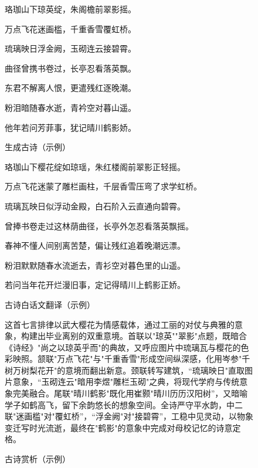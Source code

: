 \begin{figure}[ht]
  \centering
  \begin{tcolorbox}[
      colback=white,
      colframe=black,
      boxrule=1pt,
      arc=0mm,
      width=0.6\linewidth,  %
      ]
      \kaishu
      \centering
      珞珈山下琼英绽，朱阁檐前翠影摇。\par
      万点飞花迷画槛，千重香雪覆虹桥。\par
      琉璃映日浮金阙，玉砌连云接碧霄。\par
      曲径曾携书卷过，长亭忍看落英飘。\par
      东君不解离人恨，更遣残红逐晚潮。\par
      粉泪暗随春水逝，青衿空对暮山遥。\par
      他年若问芳菲事，犹记晴川鹤影娇。\par
  \end{tcolorbox}
  \caption{生成古诗（示例）}
  \label{fig:example_poem}
\end{figure}


\begin{figure}[ht]
  \centering
  \begin{tcolorbox}[
      colback=white,
      colframe=black,
      boxrule=1pt,
      arc=0mm,
      width=0.7\linewidth,  %
      ]
      \kaishu
      \centering
      珞珈山下樱花绽如琼瑶，朱红楼阁前翠影正轻摇。\par
      万点飞花迷蒙了雕栏画柱，千层香雪压弯了求学虹桥。\par
      琉璃瓦映日似浮动金殿，白石阶入云直通向碧霄。\par
      曾捧书卷走过这林荫曲径，长亭外怎忍看落英飘摇。\par
      春神不懂人间别离苦楚，偏让残红追着晚潮远漂。\par
      粉泪默默随春水流逝去，青衫空对暮色里的山遥。\par
      若问当年花开烂漫旧事，定记得晴川上鹤影正娇。\par
  \end{tcolorbox}
  \caption{古诗白话文翻译（示例）}
  \label{fig:example_translation} %
\end{figure}

\begin{figure}[ht]
  \begin{tcolorbox}[
      colback=white, %
      colframe=black, 
      boxrule=1pt,        %
      arc=0mm,             %
  ]
      \kaishu 这首七言排律以武大樱花为情感载体，通过工丽的对仗与典雅的意象，构建出毕业离别的双重意境。首联以"琼英""翠影"点题，既暗合《诗经》"尚之以琼英乎而"的典故，又呼应图片中琉璃瓦与樱花的色彩映照。颔联"万点飞花"与"千重香雪"形成空间纵深感，化用岑参"千树万树梨花开"的意境而翻出新意。颈联转写建筑，“琉璃映日"直取图片意象，“玉砌连云"暗用李煜"雕栏玉砌"之典，将现代学府与传统意象完美融合。尾联"晴川鹤影"既化用崔颢"晴川历历汉阳树”，又暗喻学子如鹤高飞，留下余韵悠长的想象空间。全诗严守平水韵，中二联"迷画槛"对"覆虹桥”，“浮金阙"对"接碧霄”，工稳中见灵动，以物象变迁写时光流逝，最终在"鹤影"的意象中完成对母校记忆的诗意定格。
  \end{tcolorbox}
  \caption{古诗赏析（示例）}
  \label{fig:example_appreciation} %
\end{figure}


